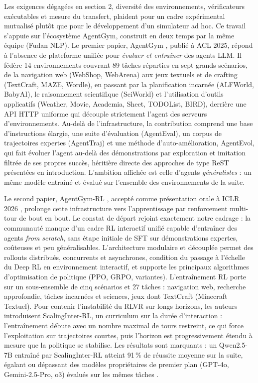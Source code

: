 \documentclass[11pt,a4paper]{article}
\begin{document}
Les exigences dégagées en section 2, diversité des environnements, vérificateurs exécutables et mesure du transfert, plaident pour un cadre expérimental mutualisé plutôt que pour le développement d'un simulateur ad hoc. Ce travail s'appuie sur l'écosystème AgentGym, construit en deux temps par la même équipe (Fudan NLP). Le premier papier, AgentGym \cite{xi_agentgym_2025}, publié à ACL 2025, répond à l'absence de plateforme unifiée pour \emph{évaluer et entraîner} des agents LLM. Il fédère 14 environnements couvrant 89 tâches réparties en sept grands scénarios, de la navigation web (WebShop, WebArena) aux jeux textuels et de crafting (TextCraft, MAZE, Wordle), en passant par la planification incarnée (ALFWorld, BabyAI), le raisonnement scientifique (SciWorld) et l'utilisation d'outils applicatifs (Weather, Movie, Academia, Sheet, TODOList, BIRD), derrière une API HTTP uniforme qui découple strictement l'agent des serveurs d'environnements. Au-delà de l'infrastructure, la contribution comprend une base d'instructions élargie, une suite d'évaluation (AgentEval), un corpus de trajectoires expertes (AgentTraj) et une méthode d'auto-amélioration, AgentEvol, qui fait évoluer l'agent au-delà des démonstrations par exploration et imitation filtrée de ses propres succès, héritière directe des approches de type ReST présentées en introduction. L'ambition affichée est celle d'agents \emph{généralistes} : un même modèle entraîné et évalué sur l'ensemble des environnements de la suite.

Le second papier, AgentGym-RL \cite{xi_agentgym-rl_2025}, accepté comme présentation orale à ICLR 2026 \cite{xi_agentgymrl_openreview}, prolonge cette infrastructure vers l'apprentissage par renforcement multi-tour de bout en bout. Le constat de départ rejoint exactement notre cadrage : la communauté manque d'un cadre RL interactif unifié capable d'entraîner des agents \emph{from scratch}, sans étape initiale de SFT sur démonstrations expertes, coûteuses et peu généralisables. L'architecture modulaire et découplée permet des rollouts distribués, concurrents et asynchrones, condition du passage à l'échelle du Deep RL en environnement interactif, et supporte les principaux algorithmes d'optimisation de politique (PPO, GRPO, variantes). L'entraînement RL porte sur un sous-ensemble de cinq scénarios et 27 tâches : navigation web, recherche approfondie, tâches incarnées et sciences, jeux dont TextCraft (Minecraft Textuel). Pour contenir l'instabilité du RLVR sur longs horizons, les auteurs introduisent ScalingInter-RL, un curriculum sur la durée d'interaction : l'entraînement débute avec un nombre maximal de tours restreint, ce qui force l'exploitation sur trajectoires courtes, puis l'horizon est progressivement étendu à mesure que la politique se stabilise. Les résultats sont marquants : un Qwen2.5-7B entraîné par ScalingInter-RL atteint 91\,\% de réussite moyenne sur la suite, égalant ou dépassant des modèles propriétaires de premier plan (GPT-4o, Gemini-2.5-Pro, o3) évalués sur les mêmes tâches \cite{xi_agentgym-rl_2025}.
\end{document}
